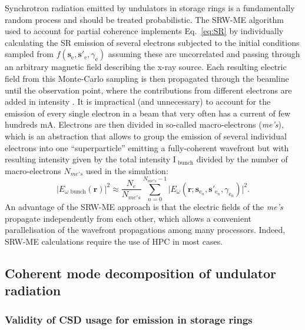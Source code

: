 \documentclass{iucr}              %
\begin{document}
Synchrotron radiation emitted by undulators in storage rings is a fundamentally random process and should be treated probabilistic. The SRW-ME algorithm used to account for partial coherence implements Eq.~\ref{eq:SR} by individually calculating the SR emission of several electrons subjected to the initial conditions sampled from $f(\textbf{s}_\text{e}, \textbf{s}'_\text{e}, \gamma_\text{e})$ assuming these are uncorrelated and passing through an arbitrary magnetic field describing the x-ray source. Each resulting electric field from this Monte-Carlo sampling is then propagated through the beamline until the observation point, where the contributions from different electrons are added in intensity \cite{codeSRW_ME}. It is impractical (and unnecessary) to account for the emission of every single electron in a beam that very often has a current of few hundreds mA. Electrons are then divided in so-called macro-electrons (\textit{me's}), which is an abstraction that allows to group the emission of several individual electrons into one ``superparticle'' emitting a fully-coherent wavefront but with resulting intensity given by the total intensity $\text{I}_\text{~bunch}$ divided by the number of macro-electrons $N_{me's}$ used in the simulation:
\begin{equation}
|E_{\omega\text{~bunch}}(\textbf{r})|^2 \approx \frac{N_e}{N_{me's}}\sum_{n=0}^{N_{me's} - 1}\big| E_\omega(\textbf{r};\textbf{s}_{\text{e}_n}, \textbf{s}'_{\text{e}_n}, \gamma_{\text{e}_n})\big|^2.
\label{eq:SR_SRW}
\end{equation}
An advantage of the SRW-ME approach is that the electric fields of the \textit{me's} propagate independently from each other, which allows a convenient parallelisation of the wavefront propagations among many processors. Indeed, SRW-ME calculations require the use of HPC in most cases.

\subsection{Coherent mode decomposition of undulator radiation}\label{sec:CMD}


\subsubsection{Validity of CSD usage for emission in storage rings}
\end{document}
